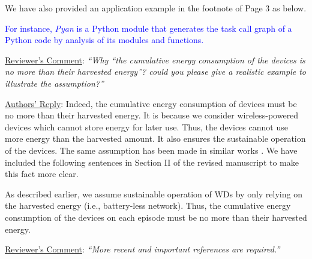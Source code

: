 \documentclass[12pt,draftclsnofoot,onecolumn]{IEEEtran}
\newcommand{\rev}[1]{{\color{blue}#1}} %
\newcommand{\rev}[1]{#1}
\newenvironment{my}[2]%
{\begin{list}{}%
{\setlength{\rightmargin}{#1}\setlength{\leftmargin}{#2}}%


 \item[]{}

} {\end{list}}
\begin{document}
\begin{enumerate}
	We have also provided an application example in the footnote of Page 3 as below.\newline
	
	\begin{my}{1cm}{1cm}
		\rev{
			\textcolor{blue}{For instance, \textit{Pyan}\cite{b41} is a Python module that generates the task call graph of a Python code by analysis of its modules and functions.}\newline
		}
	\end{my}

	\item \underline{Reviewer's Comment}: \textit{``Why ``the cumulative energy consumption of the devices is no more than their harvested energy''? could you please give a realistic example to illustrate the assumption?''}\newline
	
	\underline{Authors' Reply}: Indeed, the cumulative energy consumption of devices must be no more than their harvested energy. It is because we consider wireless-powered devices which cannot store energy for later use. Thus, the devices cannot use more energy than the harvested amount. It also ensures the sustainable operation of the devices. The same assumption has been made in similar works \cite{b10,b30,b13,b39,b26,b2}. We have included the following sentences in Section II of the revised manuscript to make this fact more clear.\newline
	
	\begin{my}{1cm}{1cm}
		\rev{
			As described earlier, we assume sustainable operation of WDs by only relying on the harvested energy (i.e., battery-less network). Thus, the cumulative energy consumption of the devices on each episode must be no more than their harvested energy.\\
		}
	\end{my}

	\item \underline{Reviewer's Comment}: \textit{``More recent and important references are required.''}\newline
	

\end{enumerate}
\end{document}

